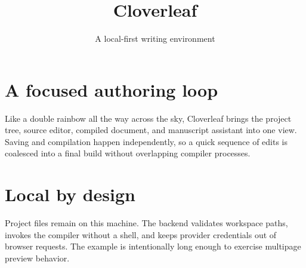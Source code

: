 \documentclass[11pt]{article}
\title{Cloverleaf}
\author{A local-first writing environment}
\date{}
\begin{document}
\maketitle



\newpage
\section{A focused authoring loop}

Like a double rainbow all the way across the sky, Cloverleaf brings the project tree, source editor, compiled document, and manuscript assistant into one view. Saving and compilation happen independently, so a quick sequence of edits is coalesced into a final build without overlapping compiler processes.

\newpage
\section{Local by design}

Project files remain on this machine. The backend validates workspace paths, invokes the compiler without a shell, and keeps provider credentials out of browser requests. The example is intentionally long enough to exercise multipage preview behavior.
\end{document}
